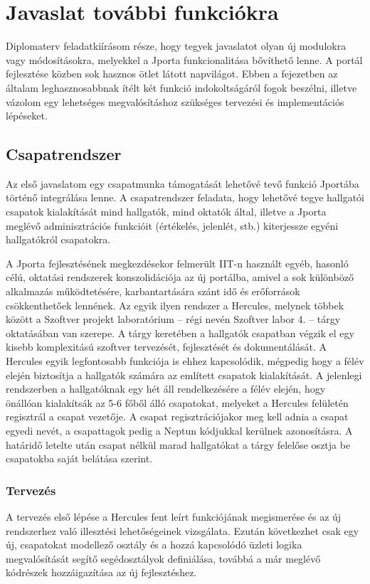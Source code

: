 \chapter{Javaslat további funkciókra}\label{chapter:features}
Diplomaterv feladatkiírásom része, hogy tegyek javaslatot olyan új modulokra vagy módosításokra, melyekkel a Jporta funkcionalitása bővíthető lenne.
A portál fejlesztése közben sok hasznos ötlet látott napvilágot.
Ebben a fejezetben az általam leghasznosabbnak ítélt két funkció indokoltságáról fogok beszélni, illetve vázolom egy lehetséges megvalósításhoz szükséges tervezési és implementációs lépéseket.

\section{Csapatrendszer}
Az első javaslatom egy csapatmunka támogatását lehetővé tevő funkció Jportába történő integrálása lenne.
A csapatrendszer feladata, hogy lehetővé tegye hallgatói csapatok kialakítását mind hallgatók, mind oktatók által, illetve a Jporta meglévő adminisztrációs funkcióit (értékelés, jelenlét, stb.) kiterjessze egyéni hallgatókról csapatokra.

A Jporta fejlesztésének megkezdésekor felmerült IIT-n használt egyéb, hasonló célú, oktatási rendszerek konszolidációja az új portálba, amivel a sok különböző alkalmazás működtetésére, karbantartására szánt idő és erőforrások csökkenthetőek lennének.
Az egyik ilyen rendszer a Hercules, melynek többek között a Szoftver projekt laboratórium -- régi nevén Szoftver labor 4. -- tárgy oktatásában van szerepe.
A tárgy keretében a hallgatók csapatban végzik el egy kisebb komplexitású szoftver tervezését, fejlesztését és dokumentálását.
A Hercules egyik legfontosabb funkciója is ehhez kapcsolódik, mégpedig hogy a félév elején biztosítja a hallgatók számára az említett csapatok kialakítását.
A jelenlegi rendszerben a hallgatóknak egy hét áll rendelkezésére a félév elején, hogy önállóan kialakítsák az 5-6 főből álló csapatokat, melyeket a Hercules felületén regisztrál a csapat vezetője.
A csapat regisztrációjakor meg kell adnia a csapat egyedi nevét, a csapattagok pedig a Neptun kódjukkal kerülnek azonosításra.
A határidő letelte után csapat nélkül marad hallgatókat a tárgy felelőse osztja be csapatokba saját belátása szerint. 

\subsection{Tervezés}
A tervezés első lépése a Hercules fent leírt funkciójának megismerése és az új rendszerhez való illesztési lehetőségeinek vizsgálata.
Ezután következhet csak egy új, csapatokat modellező osztály és a hozzá kapcsolódó üzleti logika megvalósítását segítő segédosztályok definiálása, továbbá a már meglévő kódrészek hozzáigazítása az új fejlesztéshez.

